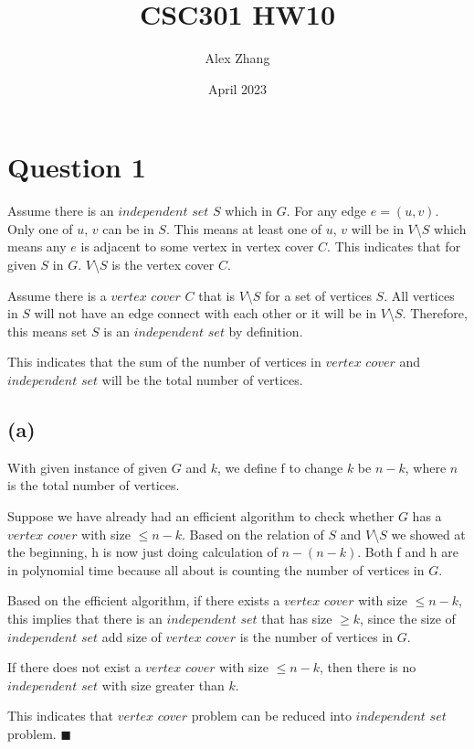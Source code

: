 \documentclass{article}
\title{CSC301 HW10}
\author{Alex Zhang}
\date{April 2023}
\begin{document}
\maketitle

\section*{Question 1}

Assume there is an $independent$ $set$ $S$ which in $G$. For any edge $e = (u,v)$. Only one of $u$, $v$ can be in
$S$. This means at least one of $u$, $v$ will be in $V$\textbackslash$S$ which means any $e$ is adjacent to some vertex in  vertex cover $C$.
This indicates that for given $S$ in $G$. $V$\textbackslash$S$ is the vertex cover $C$.

Assume there is a $vertex$ $cover$ $C$ that is $V$\textbackslash$S$ for a set of vertices $S$. All vertices in $S$ will not have an edge connect with 
each other or it will be in $V$\textbackslash$S$. Therefore, this means set $S$ is an $independent$ $set$ by definition.

This indicates that the sum of the number of vertices in $vertex$ $cover$ and $independent$ $set$ will be the total number of vertices.

\subsection*{(a)}
With given instance of given $G$ and $k$, we define f to change $k$ be $n-k$, where $n$ is the total number
of vertices.

Suppose we have already had an efficient algorithm to check whether $G$ has a $vertex$ $cover$ with size $\leq n-k$. 
Based on the relation of $S$ and $V$\textbackslash$S$ we showed at the beginning, h is now just doing calculation of $n-(n-k)$.
Both f and h are in polynomial time because all about is counting the number of vertices in $G$.

Based on the efficient algorithm, if there exists a $vertex$ $cover$ with size $\leq n-k$, this implies that there is an $independent$ $set$ that has size
$\geq k$, since the size of $independent$ $set$ add size of $vertex$ $cover$ is the number of vertices in $G$.

If there does not exist a $vertex$ $cover$ with size $\leq n-k$, then there is no $independent$ $set$ with size greater than $k$.

This indicates that $vertex$ $cover$ problem can be reduced into $independent$ $set$ problem. $\blacksquare$
\end{document}
